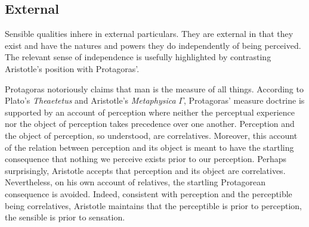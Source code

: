 \subsection{External} %
\label{sub:external}

Sensible qualities inhere in external particulars. They are external in that they exist and have the natures and powers they do independently of being perceived. The relevant sense of independence is usefully highlighted by contrasting Aristotle's position with Protagoras'.

Protagoras notoriously claims that man is the measure of all things. According to Plato's \emph{Theaetetus} and Aristotle's \emph{Metaphysica} \( \Gamma \), Protagoras' measure doctrine is supported by an account of perception where neither the perceptual experience nor the object of perception takes precedence over one another. Perception and the object of perception, so understood, are correlatives. Moreover, this account of the relation between perception and its object is meant to have the startling consequence that nothing we perceive exists prior to our perception. Perhaps surprisingly, Aristotle accepts that perception and its object are correlatives. Nevertheless, on his own account of relatives, the startling Protagorean consequence is avoided. Indeed, consistent with perception and the perceptible being correlatives, Aristotle maintains that the perceptible is prior to perception, the sensible is prior to sensation.

